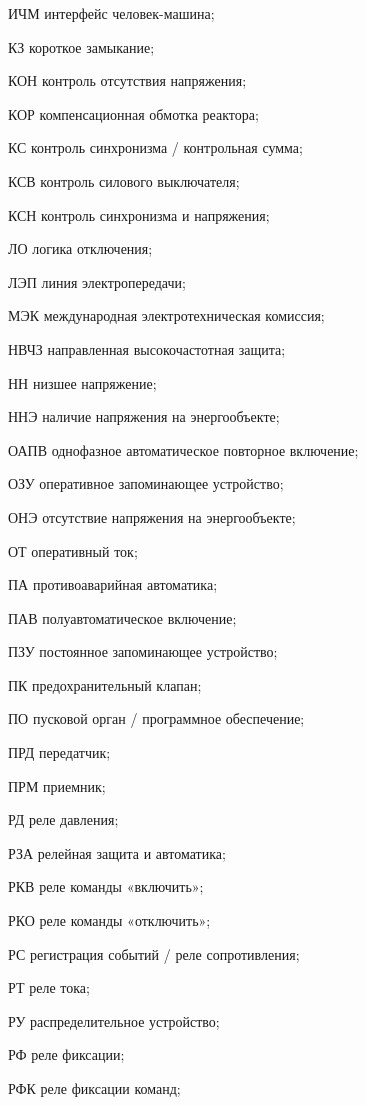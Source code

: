 \begin{list}{}
\item[ИЧМ] интерфейс человек-машина;
\item[КЗ] короткое замыкание;
\item[КОН] контроль отсутствия напряжения;
\item[КОР] компенсационная обмотка реактора;
\item[КС] контроль синхронизма / контрольная сумма;
\item[КСВ] контроль силового выключателя;
\item[КСН] контроль синхронизма и напряжения;
\item[ЛО] логика отключения;
\item[ЛЭП] линия электропередачи;
\item[МЭК] международная электротехническая комиссия;
\item[НВЧЗ] направленная высокочастотная защита;
\item[НН] низшее напряжение;
\item[ННЭ] наличие напряжения на энергообъекте;
\item[ОАПВ] однофазное автоматическое повторное включение;
\item[ОЗУ] оперативное запоминающее устройство;
\item[ОНЭ] отсутствие напряжения на энергообъекте;
\item[ОТ] оперативный ток;
\item[ПА] противоаварийная автоматика;
\item[ПАВ] полуавтоматическое включение;
\item[ПЗУ] постоянное запоминающее устройство;
\item[ПК] предохранительный клапан;
\item[ПО] пусковой орган / программное обеспечение;
\item[ПРД] передатчик;
\item[ПРМ] приемник;
\item[РД] реле давления;
\item[РЗА] релейная защита и автоматика;
\item[РКВ] реле команды «включить»;
\item[РКО] реле команды «отключить»;
\item[РС] регистрация событий / реле сопротивления;
\item[РТ] реле тока;
\item[РУ] распределительное устройство;
\item[РФ] реле фиксации;
\item[РФК] реле фиксации команд;

\end{list}

